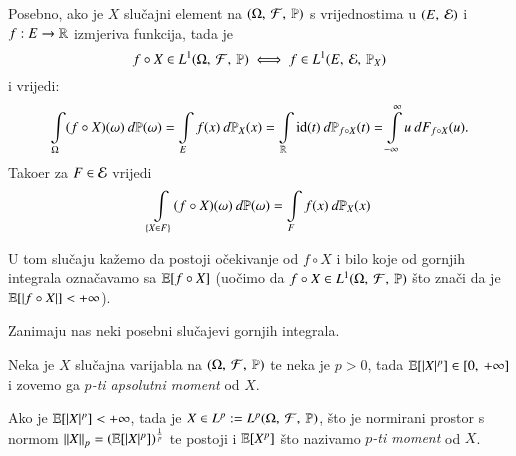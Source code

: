 Posebno, ako je $X$ slu\v cajni element na $(\Omega, \: \mathcal{F}, \: \mathbb{P})$ s vrijednostima u $({E}, \: {\mathcal{E}})$ i $f:E \to \mathbb{R}$ izmjeriva funkcija, tada je
\begin{equation*}
    f \circ X \in L^1 (\Omega, \: \mathcal{F}, \: \mathbb{P}) \iff f \in L^1 (E, \: \mathcal{E}, \: \mathbb{P}_X)
\end{equation*}
i vrijedi:
\begin{equation}    \label{jed:5.11-3-1} 
    \int\limits_{\Omega} (f \circ X) (\omega) \: d \mathbb{P} (\omega)
    = \int\limits_E f(x) \: d \mathbb{P}_X (x)
    = \int\limits_{\mathbb{R}} \mathrm{id} (t) \: d \mathbb{P}_{f \circ X} (t)
    = \int\limits_{-\infty}^{\infty} u \: d F_{f \circ X} (u).
\end{equation}
Tako\dj er za $F \in \mathcal{E}$ vrijedi
\begin{equation*}
    \int\limits_{\{ X \in F\}} (f \circ X) (\omega) \: d \mathbb{P} (\omega) = \int\limits_F f (x) \: d \mathbb{P}_X (x)
\end{equation*}

\begin{figure}[H]
    \centering
\end{figure}
U tom slu\v caju ka\v zemo da postoji o\v cekivanje od $f \circ X$ i bilo koje od gornjih integrala ozna\v cavamo sa $\mathbb{E} [f \circ X]$
(uo\v cimo da $f \circ X \in L^1 (\Omega, \: \mathcal{F}, \: \mathbb{P})$ \v sto zna\v ci da je $\mathbb{E} [|f \circ X|] < +\infty$).

Zanimaju nas neki posebni slu\v cajevi gornjih integrala.

\begin{defn}    \label{defn:5.11-4}
    Neka je $X$ slu\v cajna varijabla  na $(\Omega, \: \mathcal{F}, \: \mathbb{P})$ te neka je $p > 0$, tada $\mathbb{E} [ |X|^p ] \in [{0}, \:{+\infty}]$ i zovemo ga \emph{$p$-ti apsolutni moment} od $X$.
    
    Ako je $\mathbb{E} [ |X|^p ] < +\infty$, tada je $X \in L^p := L^p (\Omega, \: \mathcal{F}, \: \mathbb{P})$, \v sto je normirani prostor s normom $\left\lVert {X} \right\rVert_p = (\mathbb{E} [|X|^p])^{\frac{1}{p}}$ te postoji i $\mathbb{E} [ X^p ]$ \v sto nazivamo \emph{$p$-ti moment} od $X$.
\end{defn}

